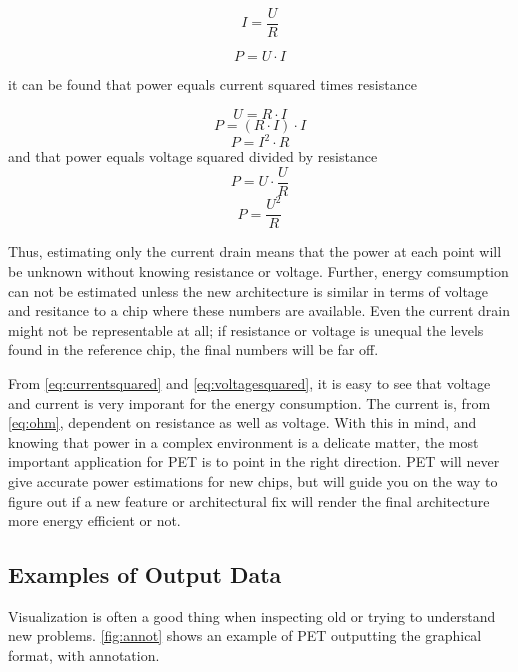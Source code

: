 \begin{equation}
I=\frac{U}{R}
\label{eq:ohm}
\end{equation}

\begin{equation}
P=U \cdot I
\label{eq:power}
\end{equation}

it can be found that power equals current squared times resistance

\[U=R \cdot I\]
\[P=(R \cdot I) \cdot I\]
\begin{equation}
P=I^2 \cdot R
\label{eq:currentsquared}
\end{equation}
and that power equals voltage squared divided by resistance
\[P=U \cdot \frac{U}{R}\]
\begin{equation}
P=\frac{U^2}{R}
\label{eq:voltagesquared}
\end{equation}

Thus, estimating only the current drain means that the power at each point will
be unknown without knowing resistance or voltage. Further, energy comsumption
can not be estimated unless the new architecture is similar in terms of voltage
and resitance to a chip where these numbers are available. Even the current
drain might not be representable at all; if resistance or voltage is unequal
the levels found in the reference chip, the final numbers will be far off.

From \autoref{eq:currentsquared} and \autoref{eq:voltagesquared}, it is easy to
see that voltage and current is very imporant for the energy consumption. The
current is, from \autoref{eq:ohm}, dependent on resistance as well as voltage.
With this in mind, and knowing that power in a complex environment is a delicate
matter, the most important application for PET is to point in the right
direction. PET will never give accurate power estimations for new chips, but
will guide you on the way to figure out if a new feature or architectural fix
will render the final architecture more energy efficient or not.


\subsection{Examples of Output Data}

Visualization is often a good thing when inspecting old or trying to understand
new problems. \autoref{fig:annot} shows an example of PET outputting the
graphical format, with annotation.

